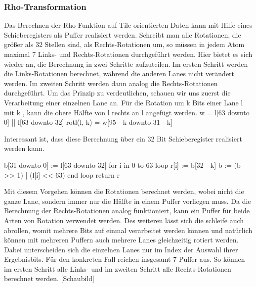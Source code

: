 \subsubsection{Rho-Transformation}

Das Berechnen der Rho-Funktion auf Tile orientierten Daten kann mit Hilfe eines Schieberegisters als Puffer realisiert werden.
Schreibt man alle Rotationen, die größer als 32 Stellen sind, als Rechts-Rotationen um, so müssen in jedem Atom maximal 7 Links- und Rechts-Rotationen durchgeführt werden.
Hier bietet es sich wieder an, die Berechnung in zwei Schritte aufzuteilen. Im ersten Schritt werden die Links-Rotationen berechnet, während die anderen Lanes nicht verändert werden.
Im zweiten Schritt werden dann analog die Rechts-Rotationen durchgeführt. Um das Prinzip zu verdeutlichen, schauen wir uns zuerst die Verarbeitung einer einzelnen Lane an.
Für die Rotation um k Bits einer Lane l mit k , kann die obere Hälfte von l rechts an l angefügt werden.
w = l[63 downto 0] || l[63 downto 32]
rotl(l, k) = w[95 - k downto 31 - k]

Interessant ist, dass diese Berechnung über ein 32 Bit Schieberegister realisiert werden kann.

b[31 downto 0] := l[63 downto 32]
for i in 0 to 63 loop
    r[i] := b[32 - k]
    b := (b >> 1) | (l[i] << 63)
end loop
return r

Mit diesem Vorgehen können die Rotationen berechnet werden, wobei nicht die ganze Lane, sondern immer nur die Hälfte in einem Puffer vorliegen muss.
Da die Berechnung der Rechts-Rotationen analog funktioniert, kann ein Puffer für beide Arten von Rotation verwendet werden.
Des weiteren lässt sich die schleife auch abrollen, womit mehrere Bits auf einmal verarbeitet werden können und natürlich können mit mehreren Puffern auch
mehrere Lanes gleichzeitig rotiert werden. Dabei unterscheiden sich die einzelnen Lanes nur im Index der Auswahl ihrer Ergebnisbits.
Für den konkreten Fall reichen insgesamt 7 Puffer aus. So können im ersten Schritt alle Links- und im zweiten Schritt alle Rechts-Rotationen berechnet werden.
[Schaubild]

